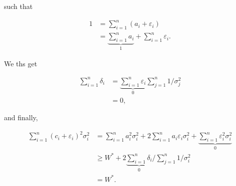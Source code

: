 \begin{solution}
such that

\begin{align*}
    1
    & =
    \sum_{i=1}^n (a_i + \varepsilon_i) \\
    & =
    \underbrace
    {
        \sum_{i=1}^n a_i
    }_1
    +
    \sum_{i=1}^n \varepsilon_i.
\end{align*}

We ths get

\begin{align*}
    \sum_{i=1}^n \delta_i
    & =
    \underbrace
    {
        \sum_{i=1}^n \varepsilon_i
    }_0
    \sum_{j=1}^n 1 / \sigma_j^2 \\
    & =
    0,
\end{align*}

and finally,

\begin{align*}
    \sum_{i=1}^n (c_i + \varepsilon_i)^2 \sigma_i^2
    & =
    \sum_{i=1}^n a_i^2 \sigma_i^2
    +
    2 \sum_{i=1}^n a_i \varepsilon_i \sigma_i^2
    +
    \underbrace
    {
        \sum_{i=1}^n \varepsilon_i^2 \sigma_i^2
    }_0 \\
    & \geq
    W^\ast
    +
    2
    \underbrace
    {
        \sum_{i=1}^n \delta_i
    }_0
    \Bigg / \sum_{j=1}^n 1 / \sigma_i^2 \\
    & =
    W^\ast.
\end{align*}

\end{solution}

